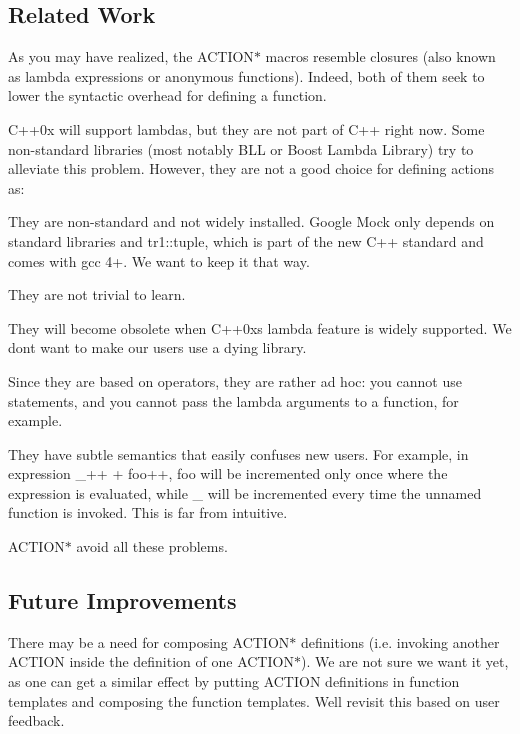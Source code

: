 \subsection*{Related Work}

As you may have realized, the {\ttfamily A\+C\+T\+I\+O\+N$\ast$} macros resemble closures (also known as lambda expressions or anonymous functions). Indeed, both of them seek to lower the syntactic overhead for defining a function.

C++0x will support lambdas, but they are not part of C++ right now. Some non-\/standard libraries (most notably B\+LL or Boost Lambda Library) try to alleviate this problem. However, they are not a good choice for defining actions as\+:


\begin{DoxyItemize}
\item They are non-\/standard and not widely installed. Google Mock only depends on standard libraries and {\ttfamily tr1\+::tuple}, which is part of the new C++ standard and comes with gcc 4+. We want to keep it that way.
\item They are not trivial to learn.
\item They will become obsolete when C++0x\textquotesingle{}s lambda feature is widely supported. We don\textquotesingle{}t want to make our users use a dying library.
\item Since they are based on operators, they are rather ad hoc\+: you cannot use statements, and you cannot pass the lambda arguments to a function, for example.
\item They have subtle semantics that easily confuses new users. For example, in expression {\ttfamily \+\_++ + foo++}, {\ttfamily foo} will be incremented only once where the expression is evaluated, while {\ttfamily \+\_} will be incremented every time the unnamed function is invoked. This is far from intuitive.
\end{DoxyItemize}

{\ttfamily A\+C\+T\+I\+O\+N$\ast$} avoid all these problems.

\subsection*{Future Improvements}

There may be a need for composing {\ttfamily A\+C\+T\+I\+O\+N$\ast$} definitions (i.\+e. invoking another {\ttfamily A\+C\+T\+I\+ON} inside the definition of one {\ttfamily A\+C\+T\+I\+O\+N$\ast$}). We are not sure we want it yet, as one can get a similar effect by putting {\ttfamily A\+C\+T\+I\+ON} definitions in function templates and composing the function templates. We\textquotesingle{}ll revisit this based on user feedback.

